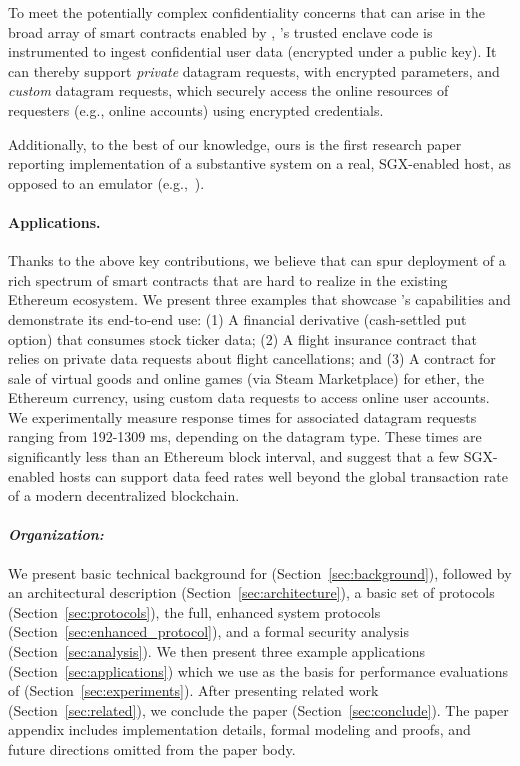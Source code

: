 \vspace{2mm}
 To meet the potentially complex confidentiality concerns that can arise in the broad array of smart contracts enabled by \tc, \tc's trusted enclave code is instrumented to ingest confidential user data (encrypted under a \tc public key). It can thereby support {\em private} datagram requests, with encrypted parameters, and {\em custom} datagram requests, which securely access the online resources of requesters (e.g., online accounts) using encrypted credentials. 

\vspace{2mm}
Additionally, to the best of our knowledge, ours is the first research paper reporting implementation of a substantive system on a real, SGX-enabled host, as opposed to an emulator (e.g.,~\cite{haven,VC3}).

\paragraph{Applications.} Thanks to the above key contributions, we believe that \tc can spur deployment of a rich spectrum of smart contracts that are hard to realize in the existing Ethereum ecosystem. We present three examples that showcase \tc's capabilities and demonstrate its end-to-end use: (1) A financial derivative (cash-settled put option) that consumes stock ticker data; (2) A flight insurance contract that relies on private data requests about flight cancellations; and (3) A contract for sale of virtual goods and online games (via Steam Marketplace) for ether, the Ethereum currency, using custom data requests to access online user accounts. We experimentally measure response times for associated datagram requests ranging from 192-1309 ms, depending on the datagram type. These times are significantly less than an Ethereum block interval, and suggest that a few SGX-enabled hosts can support \tc data feed rates well beyond the global transaction rate of a modern decentralized blockchain.

\paragraph{\em Organization:} We present basic technical background for \tc (Section~\ref{sec:background}), followed by an architectural description (Section~\ref{sec:architecture}), a basic set of protocols (Section~\ref{sec:protocols}), the full, enhanced system protocols (Section~\ref{sec:enhanced_protocol}), and a formal security analysis (Section~\ref{sec:analysis}). We then present three example applications (Section~\ref{sec:applications}) which we use as the basis for performance evaluations of \tc (Section~\ref{sec:experiments}).  After presenting related work (Section~\ref{sec:related}), we conclude the paper (Section~\ref{sec:conclude}). The paper appendix includes implementation details, formal modeling and proofs, and future directions omitted from the paper body.







